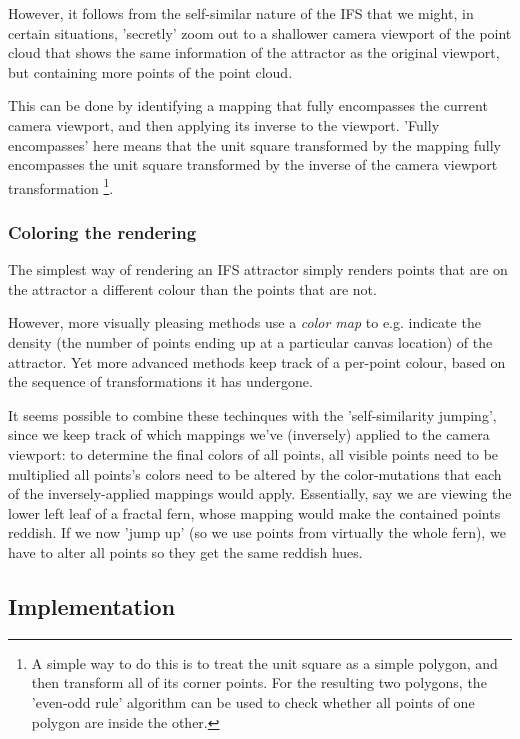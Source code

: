 \documentclass[11pt]{article}
\begin{document}
However, it follows from the self-similar nature of the IFS that we might, in certain situations,
'secretly' zoom out to a shallower camera viewport of the point cloud that shows the same information of the attractor
as the original viewport, but containing more points of the point cloud.

This can be done by identifying a mapping that fully encompasses the current camera viewport, and then applying its inverse
to the viewport.
'Fully encompasses' here means that the unit square transformed by the mapping fully encompasses
the unit square transformed by the inverse of the camera viewport transformation \footnote{A simple way to do this is to treat the unit square as a simple polygon,
and then transform all of its corner points. For the resulting two polygons, the 'even-odd rule' algorithm
\cite{haines1994point}
can be used to check whether all points of one polygon are inside the other.}.


\subsubsection{Coloring the rendering}
\label{sec:org0b00b60}
\label{subsection:coloring}

The simplest way of rendering an IFS attractor simply renders points that are on the attractor a different colour
than the points that are not.

However, more visually pleasing methods use a \emph{color map} to e.g. indicate the density (the number of points ending up at a particular canvas location) of the attractor.
Yet more advanced methods \cite{draves2003fractal} keep track of a per-point colour, based on the sequence of transformations it has undergone.

It seems possible to combine these techinques with the 'self-similarity jumping', since we keep track of which mappings we've (inversely) applied to the camera viewport:
to determine the final colors of all points, all visible points need to be multiplied 
all points's colors need to be altered by the color-mutations that each of the inversely-applied mappings would apply.
Essentially, say we are viewing the lower left leaf of a fractal fern, whose mapping would make the contained points reddish. 
If we now 'jump up' (so we use points from virtually the whole fern), we have to alter all points so they get the same reddish hues.


\subsection{Implementation}
\label{sec:org0ef1806}
\end{document}
